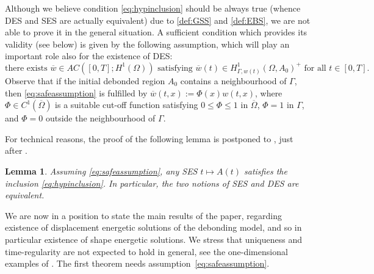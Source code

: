 \documentclass[a4paper,11pt,reqno]{amsart}
\numberwithin{equation}{section}
\newtheorem{lemma}[teo]{Lemma}
\theoremstyle{definition}
\theoremstyle{remark}
\begin{document}
Although we believe condition \eqref{eq:hypinclusion} should be always true (whence DES and SES are actually equivalent) due to \ref{def:GSS} and \ref{def:EBS}, we are not able to prove it in the general situation. A sufficient condition which provides its validity (see  below) is given by the following assumption, which will play an important role also for the existence of DES:  
\begin{equation}\label{eq:safeassumption}
    \text{there exists $\overline w\in AC([0,T];H^1(\Omega))$ satisfying $\overline w(t)\in H^1_{\Gamma,w(t)}(\Omega,A_0)^+$ for all $t\in[0,T]$.}
\end{equation}
Observe that if the initial debonded region $A_0$ contains a neighbourhood of $\Gamma$, then \eqref{eq:safeassumption} is fulfilled by $\overline w(t,x):=\Phi(x)w(t,x)$, where $\Phi\in C^1(\overline \Omega)$ is a suitable cut-off function satisfying $0\le \Phi\le 1$ in $\overline{\Omega}$, $\Phi=1$ in $\Gamma$, and $\Phi=0$ outside the neighbourhood of $\Gamma$.

For technical reasons, the proof of the following lemma is postponed to , just after .

\begin{lemma}\label{lemma:safe}
    Assuming \eqref{eq:safeassumption}, any SES $t\mapsto A(t)$ satisfies the inclusion \eqref{eq:hypinclusion}. In particular, the two notions of SES and DES are equivalent.
\end{lemma}

We are now in a position to state the main results of the paper, regarding existence of displacement energetic solutions of the debonding model, and so in particular existence of shape energetic solutions. We stress that uniqueness and time-regularity are not expected to hold in general, see the one-dimensional examples of . The first theorem needs assumption~\eqref{eq:safeassumption}.
\end{document}
